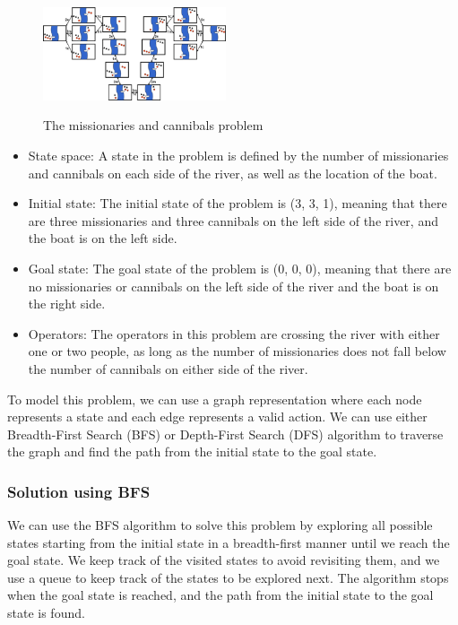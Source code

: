 \documentclass[15pt,journal]{IEEEtran}
\begin{document}
\begin{figure}[H]%
\begin {center}\href{https://courses.grainger.illinois.edu/cs440/fa2019/Lectures/search-figs/missionaries.png}{
\includegraphics[width=0.48\textwidth]{image/missionaries.png}}
\caption{\cite{missionaries}The missionaries and cannibals problem} %
\label{fig:ecg}
\end {center}
\end{figure}


\begin{itemize}
\item State space: A state in the problem is defined by the number of missionaries and cannibals on each side of the river, as well as the location of the boat.
\item Initial state: The initial state of the problem is (3, 3, 1), meaning that there are three missionaries and three cannibals on the left side of the river, and the boat is on the left side.
\item Goal state: The goal state of the problem is (0, 0, 0), meaning that there are no missionaries or cannibals on the left side of the river and the boat is on the right side.
\item Operators: The operators in this problem are crossing the river with either one or two people, as long as the number of missionaries does not fall below the number of cannibals on either side of the river.
\end{itemize}

To model this problem, we can use a graph representation where each node represents a state and each edge represents a valid action. We can use either Breadth-First Search (BFS) or Depth-First Search (DFS) algorithm to traverse the graph and find the path from the initial state to the goal state.

\subsubsection{Solution using BFS}
\par We can use the BFS algorithm to solve this problem by exploring all possible states starting from the initial state in a breadth-first manner until we reach the goal state. We keep track of the visited states to avoid revisiting them, and we use a queue to keep track of the states to be explored next. The algorithm stops when the goal state is reached, and the path from the initial state to the goal state is found.
\end{document}
